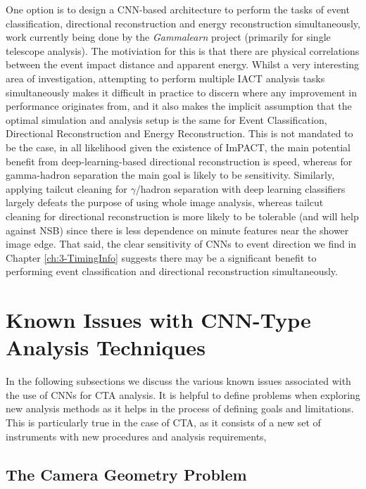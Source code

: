 One option is to design a CNN-based architecture to perform the tasks of event classification, directional reconstruction and energy reconstruction simultaneously, work currently being done by the \textit{Gammalearn} project \cite{mikaelphd} (primarily for single telescope analysis). The motiviation for this is that there are physical correlations between the event impact distance and apparent energy. Whilst a very interesting area of investigation, attempting to perform multiple IACT analysis tasks simultaneously makes it difficult in practice to discern where any improvement in performance originates from, and it also makes the implicit assumption that the optimal simulation and analysis setup is the same for Event Classification, Directional Reconstruction and Energy Reconstruction. This is not mandated to be the case, in all likelihood given the existence of ImPACT, the main potential benefit from deep-learning-based directional reconstruction is speed, whereas for gamma-hadron separation the main goal is likely to be sensitivity. Similarly, applying tailcut cleaning for $\gamma$/hadron separation with deep learning classifiers largely defeats the purpose of using whole image analysis, whereas tailcut cleaning for directional reconstruction is more likely to be tolerable (and will help against NSB) since there is less dependence on minute features near the shower image edge. That said, the clear sensitivity of CNNs to event direction we find in Chapter \ref{ch:3-TimingInfo} suggests there may be a significant benefit to performing event classification and directional reconstruction simultaneously.

\section{Known Issues with CNN-Type Analysis Techniques}
In the following subsections we discuss the various known issues associated with the use of CNNs for CTA analysis. It is helpful to define problems when exploring new analysis methods as it helps in the process of defining goals and limitations. This is particularly true in the case of CTA, as it consists of a new set of instruments with new procedures and analysis requirements,

\subsection{The Camera Geometry Problem}

